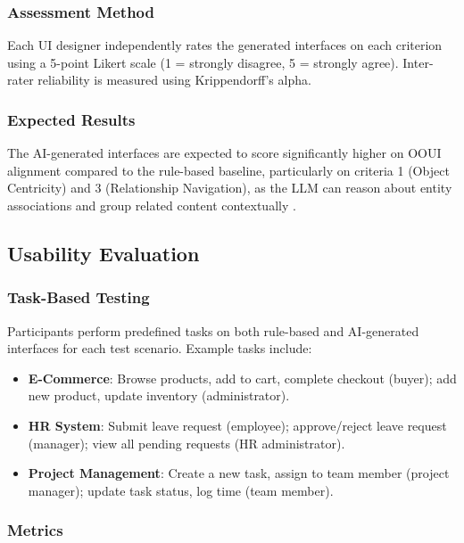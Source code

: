 \subsubsection{Assessment Method}

Each UI designer independently rates the generated interfaces on each criterion using a 5-point Likert scale (1 = strongly disagree, 5 = strongly agree). Inter-rater reliability is measured using Krippendorff's alpha.

\subsubsection{Expected Results}

The AI-generated interfaces are expected to score significantly higher on OOUI alignment compared to the rule-based baseline, particularly on criteria 1 (Object Centricity) and 3 (Relationship Navigation), as the LLM can reason about entity associations and group related content contextually \cite{dH24, Ver25}.


\subsection{Usability Evaluation}

\subsubsection{Task-Based Testing}

Participants perform predefined tasks on both rule-based and AI-generated interfaces for each test scenario. Example tasks include:

\begin{itemize}
    \item \textbf{E-Commerce}: Browse products, add to cart, complete checkout (buyer); add new product, update inventory (administrator).
    \item \textbf{HR System}: Submit leave request (employee); approve/reject leave request (manager); view all pending requests (HR administrator).
    \item \textbf{Project Management}: Create a new task, assign to team member (project manager); update task status, log time (team member).
\end{itemize}

\subsubsection{Metrics}

